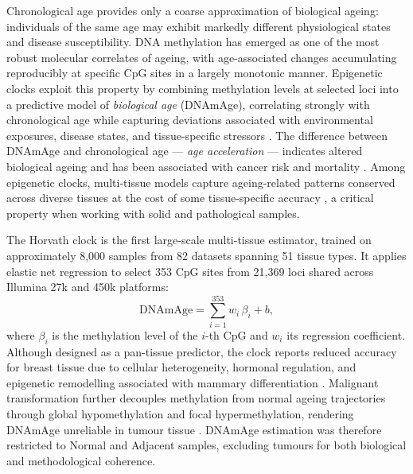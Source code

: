 Chronological age provides only a coarse approximation of biological ageing:
individuals of the same age may exhibit markedly different physiological states
and disease susceptibility. DNA methylation has emerged as one of the most robust
molecular correlates of ageing, with age-associated changes accumulating
reproducibly at specific CpG sites in a largely monotonic manner. Epigenetic
clocks exploit this property by combining methylation levels at selected loci
into a predictive model of \emph{biological age} (DNAmAge), correlating strongly
with chronological age while capturing deviations associated with environmental
exposures, disease states, and tissue-specific stressors \cite{Horvath2013,Zhang2019}.
The difference between DNAmAge and chronological age — \emph{age acceleration}
— indicates altered biological ageing and has been associated with cancer risk
and mortality \cite{Horvath2013,Zhang2019}. Among epigenetic clocks, multi-tissue
models capture ageing-related patterns conserved across diverse tissues at the
cost of some tissue-specific accuracy \cite{Horvath2013,Zhang2019}, a critical
property when working with solid and pathological samples.

The Horvath clock \cite{Horvath2013} is the first large-scale multi-tissue
estimator, trained on approximately 8,000 samples from 82 datasets spanning 51
tissue types. It applies elastic net regression to select 353 CpG sites from
21,369 loci shared across Illumina 27k and 450k platforms:
\begin{equation}
    \text{DNAmAge} = \sum_{i=1}^{353} w_i \,\beta_i + b,
\end{equation}
where $\beta_i$ is the methylation level of the $i$-th CpG and $w_i$ its
regression coefficient.
Although designed as a pan-tissue predictor, the clock reports reduced accuracy
for breast tissue due to cellular heterogeneity, hormonal regulation, and
epigenetic remodelling associated with mammary differentiation \cite{Horvath2013}.
Malignant transformation further decouples methylation from normal ageing
trajectories through global hypomethylation and focal hypermethylation, rendering
DNAmAge unreliable in tumour tissue \cite{Teschendorff2010,Zhang2019}. DNAmAge
estimation was therefore restricted to Normal and Adjacent samples, excluding
tumours for both biological and methodological coherence.

